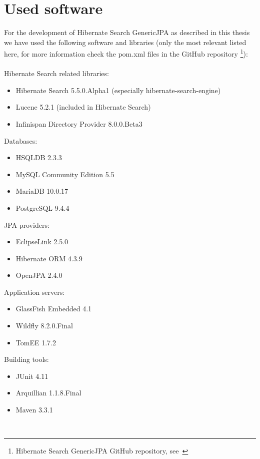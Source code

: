 \section*{Used software} \label{used_software}

For the development of Hibernate Search GenericJPA as described in this thesis we have used the following software and libraries (only the most relevant listed here, for more information check the pom.xml files in the GitHub repository \footnote{Hibernate Search GenericJPA GitHub repository, see~\cite{hibernate_genericjpa_github}}):
\\\\
\noindent
Hibernate Search related libraries:
\begin{itemize}
	\item Hibernate Search 5.5.0.Alpha1 (especially hibernate-search-engine)
	\item Lucene 5.2.1 (included in Hibernate Search)
	\item Infinispan Directory Provider 8.0.0.Beta3
\end{itemize}

\noindent
Databases:
\begin{itemize}
	\item HSQLDB 2.3.3
	\item MySQL Community Edition 5.5
	\item MariaDB 10.0.17
	\item PostgreSQL 9.4.4
\end{itemize}

\noindent
JPA providers:
\begin{itemize}
	\item EclipseLink 2.5.0
	\item Hibernate ORM 4.3.9
	\item OpenJPA 2.4.0
\end{itemize}

\noindent
Application servers:
\begin{itemize}
	\item GlassFish Embedded 4.1
	\item Wildfly 8.2.0.Final
	\item TomEE 1.7.2
\end{itemize}

\noindent
Building tools:
\begin{itemize}
	\item JUnit 4.11
	\item Arquillian 1.1.8.Final
	\item Maven 3.3.1
\end{itemize}

\pagebreak
~